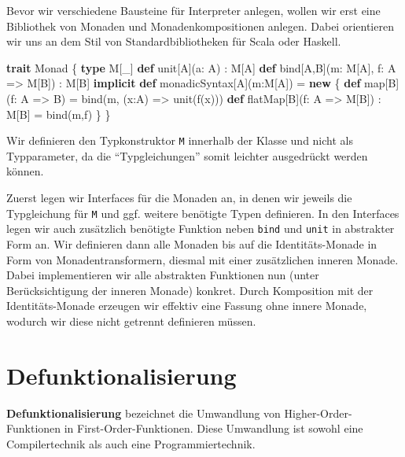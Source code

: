 \documentclass[]{article}
\newenvironment{Shaded}{}{}
\newcommand{\DataTypeTok}[1]{\textcolor[rgb]{0.56,0.13,0.00}{#1}}
\newcommand{\FunctionTok}[1]{\textcolor[rgb]{0.02,0.16,0.49}{#1}}
\newcommand{\KeywordTok}[1]{\textcolor[rgb]{0.00,0.44,0.13}{\textbf{#1}}}
\newcommand{\NormalTok}[1]{#1}
\begin{document}
Bevor wir verschiedene Bausteine für Interpreter anlegen, wollen wir
erst eine Bibliothek von Monaden und Monadenkompositionen anlegen. Dabei
orientieren wir uns an dem Stil von Standardbibliotheken für Scala oder
Haskell.

\begin{Shaded}
\begin{Highlighting}[]
\KeywordTok{trait}\NormalTok{ Monad \{}
  \KeywordTok{type}\NormalTok{ M[\_]}
  \KeywordTok{def} \DataTypeTok{unit}\NormalTok{[A](a: A) : M[A]}
  \KeywordTok{def}\NormalTok{ bind[A,B](m: M[A], f: A =\textgreater{} M[B]) : M[B]}
  \KeywordTok{implicit} \KeywordTok{def}\NormalTok{ monadicSyntax[A](m:M[A]) = }\KeywordTok{new}\NormalTok{ \{}
      \KeywordTok{def}\NormalTok{ map[B](f: A =\textgreater{} B) = }\FunctionTok{bind}\NormalTok{(m, (x:A) =\textgreater{} }\DataTypeTok{unit}\NormalTok{(}\FunctionTok{f}\NormalTok{(x)))}
      \KeywordTok{def}\NormalTok{ flatMap[B](f: A =\textgreater{} M[B]) : M[B] = }\FunctionTok{bind}\NormalTok{(m,f)}
\NormalTok{  \}}
\NormalTok{\}}
\end{Highlighting}
\end{Shaded}

Wir definieren den Typkonstruktor \texttt{M} innerhalb der Klasse und
nicht als Typparameter, da die ``Typgleichungen'' somit leichter
ausgedrückt werden können.

Zuerst legen wir Interfaces für die Monaden an, in denen wir jeweils die
Typgleichung für \texttt{M} und ggf. weitere benötigte Typen definieren.
In den Interfaces legen wir auch zusätzlich benötigte Funktion neben
\texttt{bind} und \texttt{unit} in abstrakter Form an. Wir definieren
dann alle Monaden bis auf die Identitäts-Monade in Form von
Monadentransformern, diesmal mit einer zusätzlichen inneren Monade.
Dabei implementieren wir alle abstrakten Funktionen nun (unter
Berücksichtigung der inneren Monade) konkret. Durch Komposition mit der
Identitäts-Monade erzeugen wir effektiv eine Fassung ohne innere Monade,
wodurch wir diese nicht getrennt definieren müssen.

\hypertarget{defunktionalisierung}{%
\section{Defunktionalisierung}\label{defunktionalisierung}}

\textbf{Defunktionalisierung} bezeichnet die Umwandlung von
Higher-Order-Funktionen in First-Order-Funktionen. Diese Umwandlung ist
sowohl eine Compilertechnik als auch eine Programmiertechnik.
\end{document}

